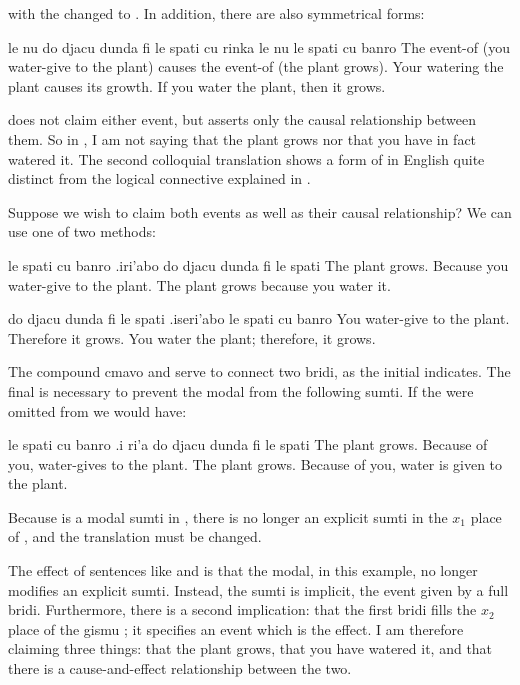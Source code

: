 {\noindent}with the  changed to . In addition, there are
    also symmetrical forms:
\begin{example}
le nu do djacu dunda fi le spati cu rinka\n
\T	le nu le spati cu banro\n
The event-of (you water-give to the plant) causes\n
\T	the event-of (the plant grows).\n
Your watering the plant causes its growth.\n
If you water the plant, then it grows.
\end{example}

{\noindent}does not claim either event, but asserts only the causal
    relationship between them. So in , I am not saying that the plant grows nor that you have
    in fact watered it. The second colloquial translation shows a
    form of  in English quite distinct from the logical
    connective  explained in . 

Suppose we wish to claim both events as well as their causal
    relationship? We can use one of two methods:
\begin{example}
le spati cu banro .iri'abo do djacu dunda fi le spati\n
The plant grows.  Because you water-give to the plant.\n
The plant grows because you water it.
\end{example}

\begin{example}
do djacu dunda fi le spati\n
\T	.iseri'abo le spati cu banro\n
You water-give to the plant.\n
\T	Therefore it grows.\n
You water the plant; therefore, it grows.
\end{example}

The compound cmavo  and  serve to
    connect two bridi, as the initial  indicates. The final
     is necessary to prevent the modal from 
    the following sumti. If the  were omitted from  we would have:
\begin{example}
le spati cu banro\n
\T	.i ri'a do djacu dunda\n
\T	fi le spati\n
The plant grows.\n
\T	Because of you,  water-gives\n
\T	to the plant.\n
The plant grows.  Because of you, water is given\n
\T	to the plant.
\end{example}

Because  is a modal sumti in , there is no longer an explicit
    sumti in the $x_1$ place of , and the translation
    must be changed.

The effect of sentences like 
    and  is that the modal, 
    in this example, no longer modifies an explicit sumti. Instead,
    the sumti is implicit, the event given by a full bridi.
    Furthermore, there is a second implication: that the first
    bridi fills the $x_2$ place of the gismu ; it specifies
    an event which is the effect. I am therefore claiming three
    things: that the plant grows, that you have watered it, and
    that there is a cause-and-effect relationship between the
    two.

